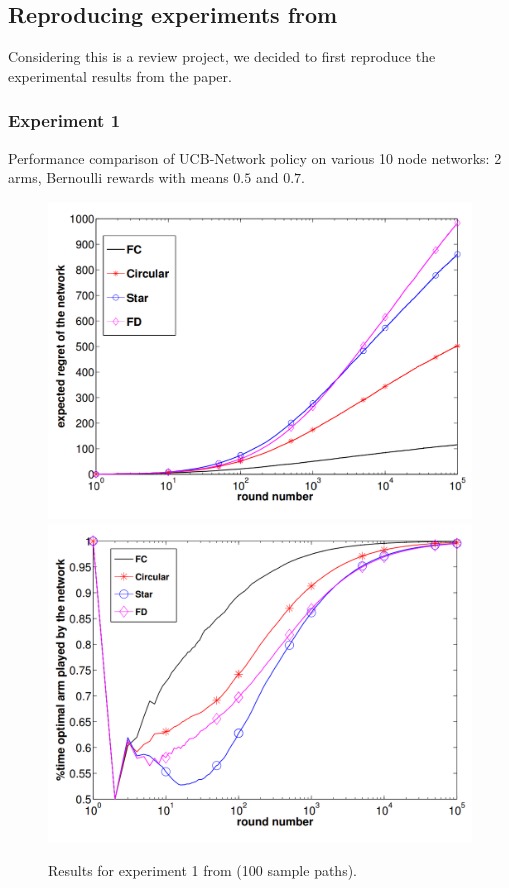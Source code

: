 \documentclass{article}
\begin{document}
\subsection{Reproducing experiments from \cite{DBLP:journals/corr/KollaJG16}}

Considering this is a review project, we decided to first reproduce the experimental results from the paper.

\subsubsection{Experiment 1}

Performance comparison of UCB-Network policy on various 10 node networks: 2 arms, Bernoulli rewards with means $0.5$ and $0.7$.

\begin{figure}[H]
  \centering
  \includegraphics[width=0.49\linewidth]{fig1_1.png}
  \includegraphics[width=0.49\linewidth]{fig1_2.png}
  \caption{Results for experiment 1 from \cite{DBLP:journals/corr/KollaJG16} (100 sample paths).}
\end{figure}
\end{document}
